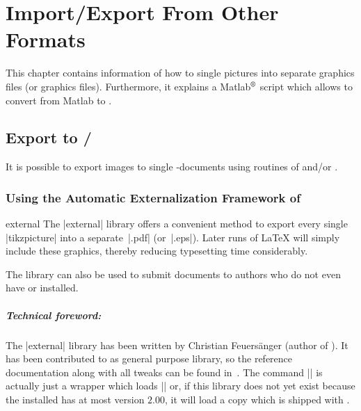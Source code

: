 
\chapter{Import/Export From Other Formats}
\label{cha:pgfplots:importexport}

{

This chapter contains information of how to single pictures into separate
\pdf{} graphics files (or \eps{} graphics files). Furthermore, it explains a
Matlab$^\text{\textregistered}$ script which allows to convert from Matlab to
\PGFPlots{}.


\section[Export to PDF/EPS]{Export to {\normalfont\pdf{}/\eps{}}}
\label{sec:pgfplots:export}

It is possible to export images to single \pdf{}-documents using routines of
\pgfname{} and/or \Tikz{}.


\subsection{Using the Automatic Externalization Framework of \Tikz}

\begin{pgfplotslibrary}{external}
    The |external| library offers a convenient method to export every single
    |tikzpicture| into a separate~|.pdf| (or~|.eps|). Later runs of \LaTeX{}
    will simply include these graphics, thereby reducing typesetting time
    considerably.

    The library can also be used to submit documents to authors who do not even
    have \PGFPlots{} or \Tikz{} installed.


    \paragraph{Technical foreword:}

    The |external| library has been written by Christian Feuers\"anger (author
    of \PGFPlots). It has been contributed to \Tikz{} as general purpose
    library, so the reference documentation along with all tweaks can be found
    in~\cite[Section ``Externalization Library'']{tikz}. The command
    || is actually just a wrapper which loads
    |\usetikzlibrary{external}| or, if this library does not yet exist because
    the installed \pgfname{} has at most version $2.00$, it will load a copy
    which is shipped with \PGFPlots{}.


\end{pgfplotslibrary}}
